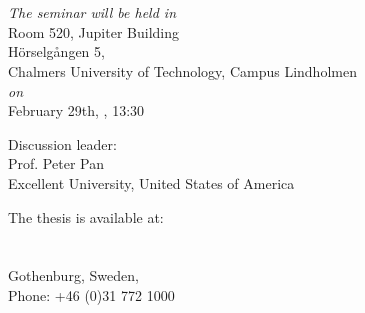 \documentclass[10pt,a4paper,onecolumn,english]{book}
\begin{document}
\frontmatter


\renewcommand{\thepage}{}

\thispagestyle{empty} %
\begin{center}
\end{center}



\begin{center} {\LARGE \textbf{\mytitle}}
\ifx\mysubtitle\undefined
\else
  \\
  \vspace{0.4cm}
  \textit{\large\mysubtitle}
\fi
\end{center}

\vspace{5mm}
\begin{center}
\textsc{\large\authorname} \\
\end{center}
\vspace{5mm}

\begin{center}
\textit{The seminar will be held in}\\
\vskip 2mm
Room 520, Jupiter Building \\
H\"{o}rselg\aa ngen 5,\\
Chalmers University of Technology, Campus Lindholmen\\
\vskip 1mm
\textit{on}\\
\vskip 1mm
February 29th, \currentyear, 13:30\\

\vspace{1cm}

Discussion leader:\\
Prof. Peter Pan\\
Excellent University, United States of America
\end{center}

\vspace{1cm}


\begin{center}
The thesis is available at:\\
\mydepartment\\
\chalIgu\\
Gothenburg, Sweden, \currentyear\\
\vspace{1cm}
Phone: +46 (0)31 772 1000
\end{center}
\end{document}
